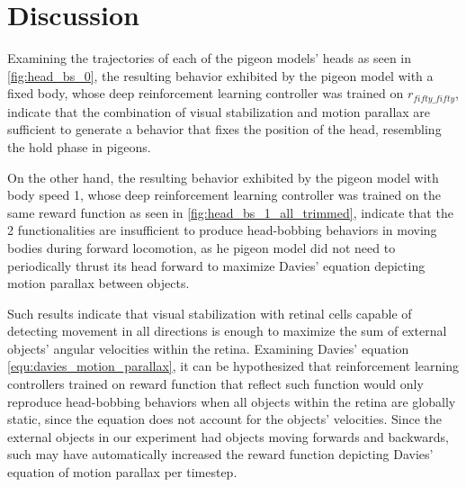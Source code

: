 \chapter{Discussion}
  Examining the trajectories of each of the pigeon models' heads as seen in \ref{fig:head_bs_0}, the resulting behavior exhibited by the pigeon model with a fixed body, whose deep reinforcement learning controller was trained on $r_{fifty\_fifty}$, indicate that the combination of visual stabilization and motion parallax are sufficient to generate a behavior that fixes the position of the head, resembling the hold phase in pigeons.

  On the other hand, the resulting behavior exhibited by the pigeon model with body speed 1, whose deep reinforcement learning controller was trained on the same reward function as seen in \ref{fig:head_bs_1_all_trimmed}, indicate that the 2 functionalities are insufficient to produce head-bobbing behaviors in moving bodies during forward locomotion, as he pigeon model did not need to periodically thrust its head forward to maximize Davies' equation depicting motion parallax between objects.

  Such results indicate that visual stabilization with retinal cells capable of detecting movement in all directions is enough to maximize the sum of external objects' angular velocities within the retina.
    Examining Davies' equation \ref{equ:davies_motion_parallax}, it can be hypothesized that reinforcement learning controllers trained on reward function that reflect such function would only reproduce head-bobbing behaviors when all objects within the retina are globally static, since the equation does not account for the objects' velocities.
    Since the external objects in our experiment had objects moving forwards and backwards, such may have automatically increased the reward function depicting Davies' equation of motion parallax per timestep.





